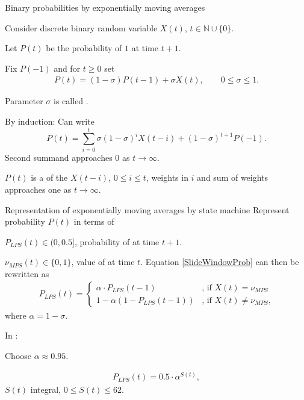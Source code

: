                    


\begin{frame}{Binary probabilities by exponentially moving averages}
\bit
\item Consider discrete binary random variable $X(t)$, $t\in\mathbb{N}\cup\{0\}$. 
\item Let $P(t)$ be the probability of $1$ at time $t+1$. 
\eit
{}
\bit
\item Fix $P(-1)$ and for $t\geq 0$ set
\begin{align}\label{SlideWindowProb}
P(t)=(1-\sigma) P(t-1)+\sigma X(t), \qquad 0\leq \sigma\leq 1. 
\end{align}
\item Parameter $\sigma$ is called .
\eit
\bit
\item By induction: Can write
\[
P(t)=\sum_{i=0}^{t}\sigma(1-\sigma)^iX(t-i)+(1-\sigma)^{t+1}P(-1). 
\] 
Second summand approaches $0$ as $t\to\infty$.
\item[\iarrow] $P(t)$ is a  of the $X(t-i)$, $0\leq i\leq t$, weights  in $i$ and sum of weights approaches one as $t\to\infty$.
\eit
\end{frame}

\begin{frame}{Representation of exponentially moving averages by state machine}
Represent probability $P(t)$ in terms of 
\bit
\item $P_{LPS}(t)\in (0,0.5]$, probability of  at time $t+1$.
\item $\nu_{MPS}(t)\in\{0,1\}$, value of  at time $t$. 
\eit
Equation \eqref{SlideWindowProb} can then be rewritten as
\begin{align}\label{SlideWindowProbLPS}
P_{LPS}(t)=\begin{cases}\alpha\cdot P_{LPS}(t-1) & \text{, if $X(t)=\nu_{MPS}$} \\ 1-\alpha(1-P_{LPS}(t-1)) & \text{, if $X(t)\neq \nu_{MPS}$,}\end{cases}
\end{align}
where
$\alpha=1-\sigma$. 

In : 
\bit
\item Choose $\alpha \approx 0.95$. 
\item {} 
\begin{align}\label{Logquant}
P_{LPS}(t)=0.5\cdot \alpha^{S(t)},
\end{align}
$S(t)$ integral, $0\leq S(t)\leq 62$. 
\eit
\end{frame}

